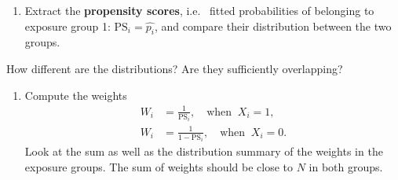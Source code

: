 \documentclass[
]{book}
\newenvironment{Shaded}{\begin{snugshade}}{\end{snugshade}}
\newcommand{\AttributeTok}[1]{\textcolor[rgb]{0.13,0.29,0.53}{#1}}
\newcommand{\DecValTok}[1]{\textcolor[rgb]{0.00,0.00,0.81}{#1}}
\newcommand{\FunctionTok}[1]{\textcolor[rgb]{0.13,0.29,0.53}{\textbf{#1}}}
\newcommand{\NormalTok}[1]{#1}
\newcommand{\OtherTok}[1]{\textcolor[rgb]{0.56,0.35,0.01}{#1}}
\newcommand{\SpecialCharTok}[1]{\textcolor[rgb]{0.81,0.36,0.00}{\textbf{#1}}}
\newcommand{\StringTok}[1]{\textcolor[rgb]{0.31,0.60,0.02}{#1}}
\providecommand{\tightlist}{%
  \setlength{\itemsep}{0pt}\setlength{\parskip}{0pt}}
\begin{document}
\begin{enumerate}
\def\labelenumi{\arabic{enumi}.}
\setcounter{enumi}{1}
\tightlist
\item
  Extract the \textbf{propensity scores}, i.e.~
  fitted probabilities of
  belonging to exposure group 1:
  \(\text{PS}_i = \widehat{p_i}\), and
  compare their distribution between the two groups.
\end{enumerate}

\begin{Shaded}
\end{Shaded}

How different are the distributions? Are they sufficiently overlapping?

\begin{enumerate}
\def\labelenumi{\arabic{enumi}.}
\setcounter{enumi}{2}
\tightlist
\item
  Compute the weights
  \[
  \begin{aligned}
   W_i & = \frac{1}{\text{PS}_i}, \quad \text{when }\ X_i=1, \\
   W_i & = \frac{1}{1-\text{PS}_i}, \quad \text{when }\ X_i=0 . 
  \end{aligned} 
  \]
  Look at the sum as well as
  the distribution summary of the weights in the exposure groups. The
  sum of weights should be close to \(N\) in both groups.
\end{enumerate}

\begin{Shaded}
\end{Shaded}
\end{document}
